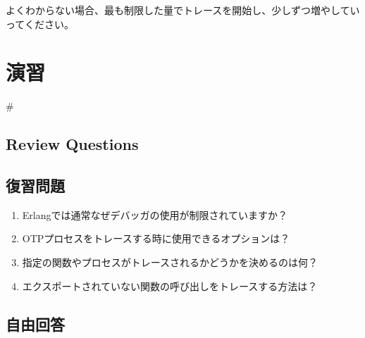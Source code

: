 よくわからない場合、最も制限した量でトレースを開始し、少しずつ増やしていってください。

\section{演習}

#\subsection*{Review Questions}
\subsection*{復習問題}

\begin{enumerate}
	\item Erlangでは通常なぜデバッガの使用が制限されていますか？
	\item OTPプロセスをトレースする時に使用できるオプションは？
	\item 指定の関数やプロセスがトレースされるかどうかを決めるのは何？
	\item エクスポートされていない関数の呼び出しをトレースする方法は？
\end{enumerate}

\subsection*{自由回答}

